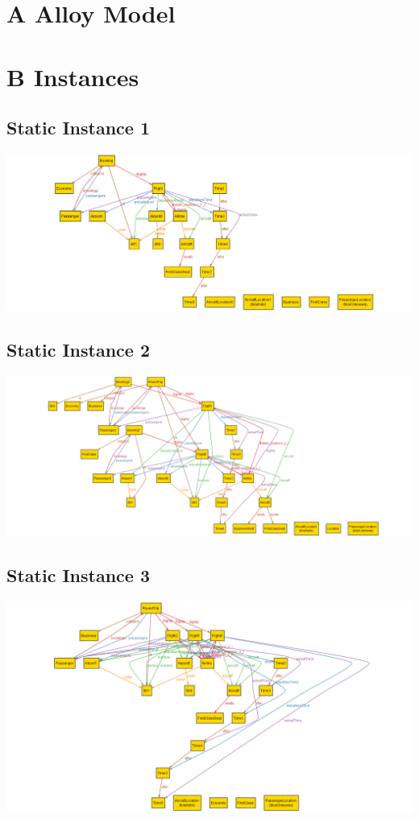 \documentclass[12pt,a4paper,titlepage]{article}
\title{\doctitle}
\author{\docauthor}
\date{\d_mny\today}
\begin{document}
\begin{center}{\bfseries\Huge\doctitle}\end{center}
\section{A Alloy Model}


\section{B Instances}
\subsection{Static Instance 1}
\includegraphics[width=\textwidth]{static_instance_1}
\subsection{Static Instance 2}
\includegraphics[width=\textwidth]{static_instance_2}
\subsection{Static Instance 3}
\includegraphics[width=\textwidth]{static_instance_3}
\end{document}
